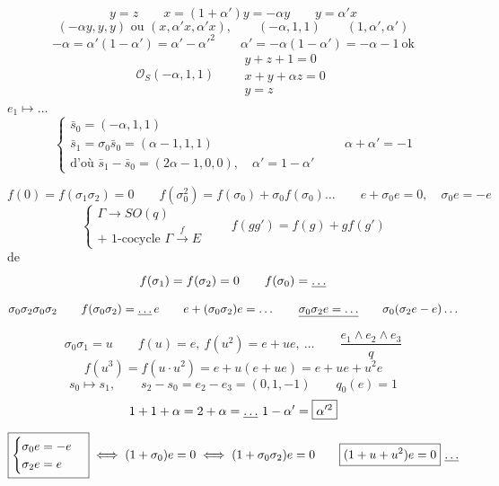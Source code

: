 \documentclass[11pt,a4paper]{article}
\begin{document}
\[
y = z \qquad x = (1+\alpha')y = -\alpha y \qquad y = \alpha' x
\]
\[
(-\alpha y, y, y) \text{ ou } (x, \alpha' x, \alpha' x), \qquad (-\alpha, 1, 1) \qquad (1, \alpha', \alpha')
\]
\[
-\alpha = \alpha'(1-\alpha') = \alpha' - \alpha'^2 \qquad \alpha' = -\alpha(1-\alpha') = -\alpha - 1 \ \text{ok}
\]
\[
\mathcal{O}_S(-\alpha, 1, 1)
\qquad
\begin{array}{l} y + z + 1 = 0 \\ x + y + \alpha z = 0 \\ y = z \end{array}
\]
$e_1 \mapsto \ldots$
\[
\begin{cases}
\bar s_0 = (-\alpha, 1, 1) \\
\bar s_1 = \sigma_0 \bar s_0 = (\alpha - 1, 1, 1) \\
\text{d'où } \bar s_1 - \bar s_0 = (2\alpha - 1, 0, 0), \quad \alpha' = 1 - \alpha'
\end{cases}
\qquad \alpha + \alpha' = -1
\]

\[
f(0) = f(\sigma_1\sigma_2) = 0
\qquad
f(\sigma_0^2) = f(\sigma_0) + \sigma_0 f(\sigma_0) \ldots
\qquad e + \sigma_0 e = 0, \quad \boxed{\sigma_0 e = -e}
\]
\[
\begin{cases}
\Gamma \to SO(q) \\
+ \text{ 1-cocycle } \Gamma \xrightarrow{\ f\ } E
\end{cases}
\qquad
f(gg') = f(g) + g f(g')
\]
 de 
\[
f(\sigma_1) = f(\sigma_2) = 0 \qquad f(\sigma_0) = \struck{\ldots}
\]
\[
\sigma_0\sigma_2\sigma_0\sigma_2 \qquad f(\sigma_0\sigma_2) = \struck{\ldots}\, e \qquad e + (\sigma_0\sigma_2)e = \ldots \qquad \struck{\sigma_0\sigma_2 e = \ldots} \qquad \sigma_0(\sigma_2 e - e) \ldots
\]
\[
\sigma_0\sigma_1 = u \qquad f(u) = e,\ f(u^2) = e + ue,\ \ldots
\qquad
\frac{e_1 \wedge e_2 \wedge e_3}{q}
\]
\[
f(u^3) = f(u \cdot u^2) = e + u(e + ue) = e + ue + u^2 e
\]
\[
s_0 \mapsto s_1, \qquad s_2 - s_0 = e_2 - e_3 = (0, 1, -1)
\qquad
\boxed{q_0(e) = 1}
\]
\[
1 + 1 + \alpha = 2 + \alpha = \struck{\ldots}\ 1 - \alpha' = \boxed{\alpha'^2}
\]
\[
\boxed{\begin{cases} \sigma_0 e = -e \\ \sigma_2 e = e \end{cases}}
\iff (1 + \sigma_0)e = 0
\iff (1 + \sigma_0\sigma_2)e = 0
\qquad
\boxed{(1 + u + u^2)e = 0}\ \struck{\ldots}
\]
\end{document}
